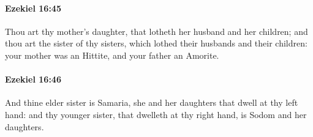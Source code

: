 		\paragraph{Ezekiel 16:45} %
			\label{EZEKIEL-16-45}

			Thou art thy mother’s daughter, that lotheth her husband and her children; and thou art the sister of thy sisters, which lothed their husbands and their children: your mother was an Hittite, and your father an Amorite.


		\paragraph{Ezekiel 16:46} %
			\label{EZEKIEL-16-46}

			And thine elder sister is Samaria, she and her daughters that dwell at thy left hand: and thy younger sister, that dwelleth at thy right hand, is Sodom and her daughters.


